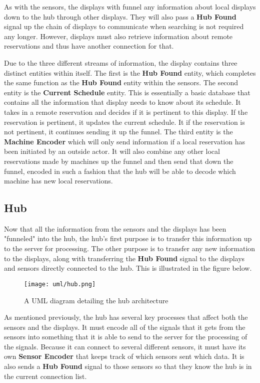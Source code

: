 \documentclass[PPFS.tex]{template/subfiles}
\begin{document}
As with the sensors, the displays with funnel any information about local displays down to the hub through other displays. They will also pass a \textbf{Hub Found} signal up the chain of displays to communicate when searching is not required any longer. However, displays must also retrieve information about remote reservations and thus have another connection for that.

Due to the three different streams of information, the display contains three distinct entities within itself. The first is the \textbf{Hub Found} entity, which completes the same function as the \textbf{Hub Found} entity within the sensors. The second entity is the \textbf{Current Schedule} entity. This is essentially a basic database that contains all the information that display needs to know about its schedule. It takes in a remote reservation and decides if it is pertinent to this display. If the reservation is pertinent, it updates the current schedule. It if the reservation is not pertinent, it continues sending it up the funnel. The third entity is the \textbf{Machine Encoder} which will only send information if a local reservation has been initiated by an outside actor. It will also combine any other local reservations made by machines up the funnel and then send that down the funnel, encoded in such a fashion that the hub will be able to decode which machine has new local reservations.

\subsection{Hub}

Now that all the information from the sensors and the displays has been "funneled" into the hub, the hub's first purpose is to transfer this information up to the server for processing. The other purpose is to transfer any new information to the displays, along with transferring the \textbf{Hub Found} signal to the displays and sensors directly connected to the hub. This is illustrated in the figure below.

\begin{figure}[h]
    \centering
    \texttt{[image: uml/hub.png]}
    \caption{A UML diagram detailing the hub architecture}
\end{figure}

As mentioned previously, the hub has several key processes that affect both the sensors and the displays. It must encode all of the signals that it gets from the sensors into something that it is able to send to the server for the processing of the signals. Because it can connect to several different sensors, it must have its own \textbf{Sensor Encoder} that keeps track of which sensors sent which data. It is also sends a \textbf{Hub Found} signal to those sensors so that they know the hub is in the current connection list.
\end{document}
